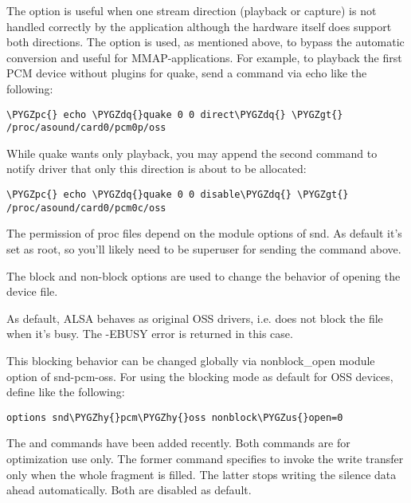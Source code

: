\documentclass[a4paper,8pt,english]{sphinxmanual}
\def\PYGZus{\char`\_}
\def\PYGZgt{\char`\>}
\def\PYGZpc{\char`\%}
\def\PYGZhy{\char`\-}
\def\PYGZdq{\char`\"}
\begin{document}
The  option is useful when one stream direction (playback or
capture) is not handled correctly by the application although the
hardware itself does support both directions.
The  option is used, as mentioned above, to bypass the automatic
conversion and useful for MMAP-applications.
For example, to playback the first PCM device without plugins for
quake, send a command via echo like the following:

\begin{Verbatim}[commandchars=\\\{\}]
\PYGZpc{} echo \PYGZdq{}quake 0 0 direct\PYGZdq{} \PYGZgt{} /proc/asound/card0/pcm0p/oss
\end{Verbatim}

While quake wants only playback, you may append the second command
to notify driver that only this direction is about to be allocated:

\begin{Verbatim}[commandchars=\\\{\}]
\PYGZpc{} echo \PYGZdq{}quake 0 0 disable\PYGZdq{} \PYGZgt{} /proc/asound/card0/pcm0c/oss
\end{Verbatim}

The permission of proc files depend on the module options of snd.
As default it's set as root, so you'll likely need to be superuser for
sending the command above.

The block and non-block options are used to change the behavior of
opening the device file.

As default, ALSA behaves as original OSS drivers, i.e. does not block
the file when it's busy. The -EBUSY error is returned in this case.

This blocking behavior can be changed globally via nonblock\_open
module option of snd-pcm-oss.  For using the blocking mode as default
for OSS devices, define like the following:

\begin{Verbatim}[commandchars=\\\{\}]
options snd\PYGZhy{}pcm\PYGZhy{}oss nonblock\PYGZus{}open=0
\end{Verbatim}

The  and  commands have been added recently.
Both commands are for optimization use only.  The former command
specifies to invoke the write transfer only when the whole fragment is
filled.  The latter stops writing the silence data ahead
automatically.  Both are disabled as default.
\end{document}
